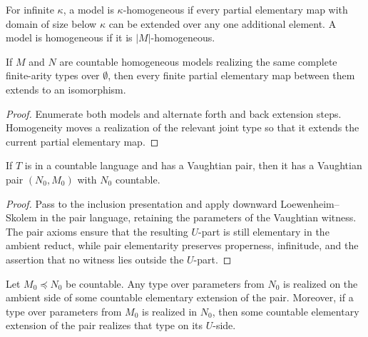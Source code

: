 \begin{definition}
\label{def:homogeneous-model}
\leanok
{}
For infinite \(\kappa\), a model is \(\kappa\)-homogeneous if every
partial elementary map with domain of size below \(\kappa\) can be
extended over any one additional element.  A model is homogeneous if it
is \(|M|\)-homogeneous.
\end{definition}

\begin{theorem}
\label{thm:homogeneous-back-and-forth}
If \(M\) and \(N\) are countable homogeneous models realizing the same
complete finite-arity types over \(\emptyset\), then every finite
partial elementary map between them extends to an isomorphism.
\end{theorem}

\begin{proof}
Enumerate both models and alternate forth and back extension steps.
Homogeneity moves a realization of the relevant joint type so that it
extends the current partial elementary map.
\end{proof}

\begin{lemma}
\label{lem:countable-vaughtian-pair}
If \(T\) is in a countable language and has a Vaughtian pair, then it
has a Vaughtian pair \((N_0,M_0)\) with \(N_0\) countable.
\end{lemma}

\begin{proof}
Pass to the inclusion presentation and apply downward
Loewenheim--Skolem in the pair language, retaining the parameters of the
Vaughtian witness.  The pair axioms ensure that the resulting
\(U\)-part is still elementary in the ambient reduct, while pair
elementarity preserves properness, infinitude, and the assertion that no
witness lies outside the \(U\)-part.
\end{proof}

\begin{lemma}
\label{lem:realize-types-in-extension-pair}
Let \(M_0\preceq N_0\) be countable.  Any type over parameters from
\(N_0\) is realized on the ambient side of some countable elementary
extension of the pair.  Moreover, if a type over parameters from
\(M_0\) is realized in \(N_0\), then some countable elementary extension
of the pair realizes that type on its \(U\)-side.
\end{lemma}

